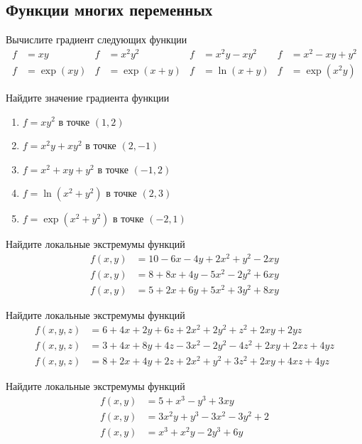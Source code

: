 \subsection{Функции многих переменных}

\begin{exercise}
Вычислите градиент следующих функции
\begin{align*}
	f&=xy & f&=x^2y^2 &  f&=x^2y-xy^2 & f&=x^2-xy+y^2 \\
	f&=\exp(xy) & f&=\exp(x+y) & f&=\ln(x+y) & f&=\exp(x^2y)
\end{align*}
\end{exercise}

\begin{exercise}
Найдите значение градиента функции
\begin{enumerate}
	\item \(f=xy^2\) в точке \((1,2)\)
	\item \(f=x^2y+xy^2\) в точке \((2,-1)\)
	\item \(f=x^2+xy+y^2\) в точке \((-1,2)\)
	\item \(f=\ln(x^2+y^2)\) в точке \((2,3)\)
	\item \(f=\exp(x^2+y^2)\) в точке \((-2,1)\)
\end{enumerate}
\end{exercise}

\begin{exercise}
Найдите локальные экстремумы функций
\begin{align*}
	f(x,y) &= 10-6x-4y+2x^2+y^2-2xy \\
	f(x,y) &= 8+8x+4y-5x^2-2y^2+6xy \\
	f(x,y) &= 5+2x+6y+5x^2+3y^2+8xy
\end{align*}
\end{exercise}

\begin{exercise}
Найдите локальные экстремумы функций
\begin{align*}
	f(x,y,z) &= 6+4x+2y+6z+2x^2+2y^2+z^2+2xy+2yz \\
	f(x,y,z) &= 3+4x+8y+4z-3x^2-2y^2-4z^2+2xy+2xz+4yz\\
	f(x,y,z) &= 8+2x+4y+2z+2x^2+y^2+3z^2+2xy+4xz+4yz
\end{align*}
\end{exercise}
	
\begin{exercise}
Найдите локальные экстремумы функций
\begin{align*}
	f(x,y) &= 5+x^3-y^3+3xy \\
	f(x,y) &= 3x^2y+y^3-3x^2-3y^2+2 \\
	f(x,y) &= x^3+x^2y-2y^3+6y
\end{align*}
\end{exercise}

